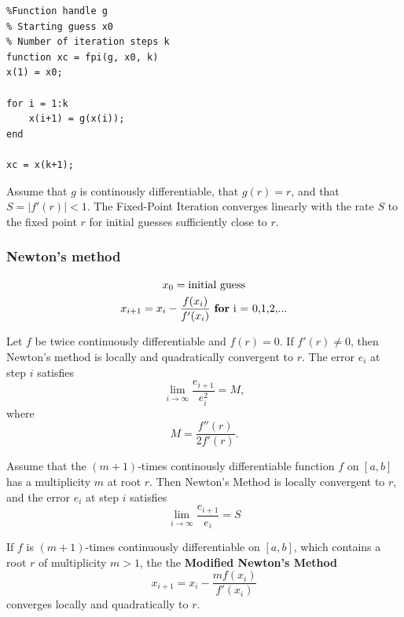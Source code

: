 \begin{lstlisting}
%Function handle g
% Starting guess x0
% Number of iteration steps k
function xc = fpi(g, x0, k)
x(1) = x0;

for i = 1:k
    x(i+1) = g(x(i));
end

xc = x(k+1);
\end{lstlisting}

\begin{theorem*}
Assume that $g$ is continously differentiable, that $g(r) = r$, and that $S = |f'(r)| < 1$. The Fixed-Point Iteration converges linearly with the rate $S$ to the fixed point $r$ for initial guesses sufficiently close to $r$.
\end{theorem*}

\subsubsection{Newton's method} 
\begin{gather*}
x_0 = \text{initial guess} \\
x_{i+1} = x_i - \frac{f(x_i)}{f'(x_i)} \text{ \textbf{for} i = 0,1,2,...}
\end{gather*}

\begin{theorem*}
Let $f$ be twice continuously differentiable and $f(r) = 0$. If $f'(r) \neq 0$, then Newton's method is locally and quadratically convergent to $r$. The error $e_i$ at step $i$ satisfies
$$
\lim_{i \to \infty} \frac{e_{i+1}}{e_{i}^2} = M,
$$
where
$$
M = \frac{f''(r)}{2f'(r)}.
$$
\end{theorem*}

\begin{theorem*}
Assume that the $(m+1)$-times continously differentiable function $f$ on $[a,b]$ has a multiplicity $m$ at root $r$. Then Newton's Method is locally convergent to $r$, and the error $e_i$ at step $i$ satisfies
$$
\lim_{i \to \infty} \frac{e_{i+1}}{e_{i}} = S
$$
\end{theorem*}

\begin{theorem*}
If $f$ is $(m+1)$-times continuously differentiable on $[a,b]$, which contains a root $r$ of multiplicity $m > 1$, the the \textbf{Modified Newton's Method}
$$
x_{i+1} = x_i - \frac{m f(x_i)}{f'(x_i)}
$$
converges locally and quadratically to $r$.
\end{theorem*}
\hfill 